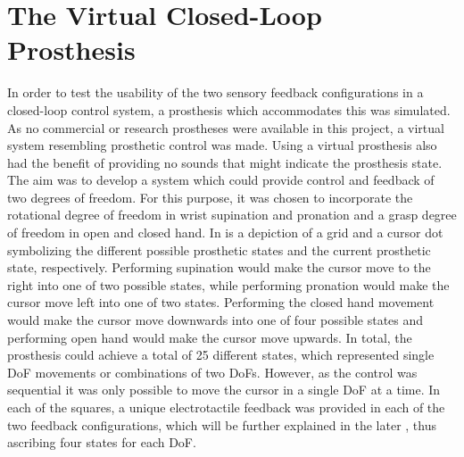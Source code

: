 
\section{The Virtual Closed-Loop Prosthesis} \label{sec:vp}

In order to test the usability of the two sensory feedback configurations in a closed-loop control system, a prosthesis which accommodates this was simulated. As no commercial or research prostheses were available in this project, a virtual system resembling prosthetic control was made. Using a virtual prosthesis also had the benefit of providing no sounds that might indicate the prosthesis state. \\
The aim was to develop a system which could provide control and feedback of two degrees of freedom. For this purpose, it was chosen to incorporate the rotational degree of freedom in wrist supination and pronation and a grasp degree of freedom in open and closed hand. In  is a depiction of a grid and a cursor dot symbolizing the different possible prosthetic states and the current prosthetic state, respectively. Performing supination would make the cursor move to the right into one of two possible states, while performing pronation would make the cursor move left into one of two states. Performing the closed hand movement would make the cursor move downwards into one of four possible states and performing open hand would make the cursor move upwards. In total, the prosthesis could achieve a total of 25 different states, which represented single DoF movements or combinations of two DoFs. However, as the control was sequential it was only possible to move the cursor in a single DoF at a time. In each of the squares, a unique electrotactile feedback was provided in each of the two feedback configurations, which will be further explained in the later , thus ascribing four states for each DoF.      
     

